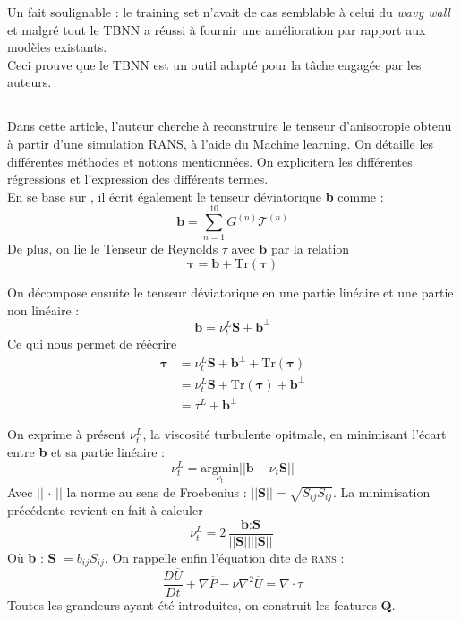 \documentclass[a4paper,12pt]{report}
\newcommand{\bepar}[1]{
	\left( #1 \right)  
}
\newcommand{\norm}[1]{
	\left \vert \left \vert #1 \right \vert  \right \vert
}
\numberwithin{equation}{section} %
\begin{document}
Un fait soulignable : le training set n'avait de cas semblable à celui du \textit{wavy wall} et malgré tout le TBNN a réussi à fournir une amélioration par rapport aux modèles existants.\\
Ceci prouve que le TBNN est un outil adapté pour la tâche engagée par les auteurs.
\pagebreak

\subsection*{\cite{wu2018data}}
Dans cette article, l'auteur cherche à reconstruire le tenseur d'anisotropie obtenu à partir d'une simulation RANS, à l'aide du Machine learning. On détaille les différentes méthodes et notions mentionnées. On explicitera les différentes régressions et l'expression des différents termes.\\

\noindent En se base sur \cite{pope1975more} , il écrit également le tenseur déviatorique \textbf{b} comme : 
\begin{equation*}
\textbf{b} = \sum_{n=1}^{10} G^{(n)} \mathcal{T}^{(n)}
\end{equation*}
De plus, on lie le Tenseur de Reynolds \textbf{$\tau$} avec $\textbf{b}$ par la relation \begin{equation*}
\mathbf{\tau }= \textbf{b} + \text{Tr}\bepar{\mathbf{\tau}} 
\end{equation*}

\noindent On décompose ensuite le tenseur déviatorique en une partie linéaire et une partie non linéaire :
\begin{equation*}
\textbf{b} = \nu_t^L\textbf{S} + \textbf{b}^\perp
\end{equation*}
Ce qui nous permet de réécrire 
\begin{align*}
\mathbf{\tau }&= \nu_t^L\textbf{S} + \textbf{b}^\perp + \text{Tr}\bepar{\mathbf{\tau}} \\
&= \nu_t^L\textbf{S} + \text{Tr}\bepar{\mathbf{\tau}}  + \textbf{b}^\perp \\
&= \tau^L + \textbf{b}^\perp
\end{align*}

\noindent On exprime à présent $\nu_t^L$, la viscosité turbulente opitmale, en minimisant l'écart entre \textbf{b} et sa partie linéaire : $$\nu_t^L = \underset{\nu_t}{\text{argmin}} \norm{\textbf{b} - \nu_t\textbf{S}} $$
Avec $\norm{\, \cdot \, }$ la norme au sens de Froebenius : $\norm{\textbf{S}} = \sqrt{S_{ij}S_{ij}}$. La minimisation précédente revient en fait à calculer $$ \nu_t^L = 2\,  \frac{\textbf{b}:\textbf{S}}{\norm{\textbf{S}} \norm{\textbf{S}}}$$ Où \textbf{b} : \textbf{S} $= b_{ij}S_{ij}$.
On rappelle enfin l'équation dite de \textsc{rans} :
$$ \frac{D\overline{U} }{Dt} + \nabla \overline{P} - \nu \nabla^2 \overline{U} = \nabla \cdot \tau$$
\noindent Toutes les grandeurs ayant été introduites, on construit les features \textbf{Q}.\\[2mm]
\end{document}
